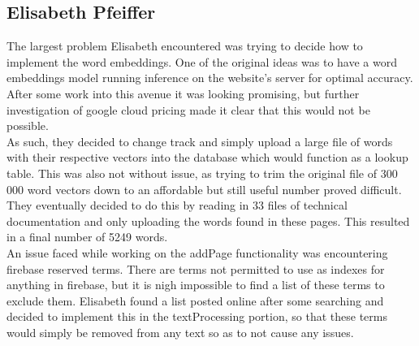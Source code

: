\subsection{Elisabeth Pfeiffer}
The largest problem Elisabeth encountered was trying to decide how to implement the word embeddings. One of the original ideas was to have a word embeddings model running inference on the website's server for optimal accuracy. After some work into this avenue it was looking promising,  but further investigation of google cloud pricing made it clear that this would not be possible. \\
As such, they decided to change track and simply upload a large file of words with their respective vectors into the database which would function as a lookup table. This was also not without issue, as trying to trim the original file of 300 000 word vectors down to an affordable but still useful number proved difficult.
They eventually decided to do this by reading in 33 files of technical documentation and only uploading the words found in these pages. This resulted in a final number of 5249 words. \\

An issue faced while working on the addPage functionality was encountering firebase reserved terms. There are terms not permitted to use as indexes for anything in firebase, but it is nigh impossible to find a list of these terms to exclude them. Elisabeth found a list posted online after some searching and decided to implement this in the textProcessing portion, so that these terms would simply be removed from any text so as to not cause any issues.
